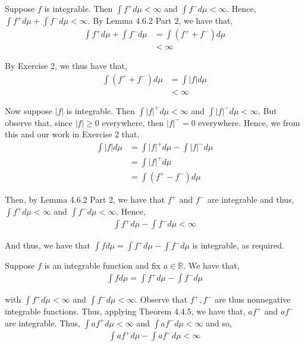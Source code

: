 \documentclass[12pt]{article}
\newenvironment{problem}[2][Problem]{\begin{trivlist}
\item[\hskip \labelsep {\bfseries #1}\hskip \labelsep {\bfseries #2.}]}{\end{trivlist}}
\begin{document}
\newpage
\begin{problem}{3}
\end{problem}

Suppose $f$ is integrable. Then $\int f^+ d\mu < \infty$ and $\int f^- d\mu < \infty$. Hence, $\int f^+ d\mu + \int f^- d\mu < \infty$. By Lemma 4.6.2 Part 2, we have that,
\begin{align*}
\int f^+ d\mu + \int f^- d\mu &= \int (f^+ + f^-) d\mu\\
&< \infty
\end{align*}

By Exercise 2, we thus have that,
\begin{align*}
\int (f^+ + f^-) d\mu &= \int |f| d\mu\\
&< \infty
\end{align*}

Now suppose $|f|$ is integrable. Then $\int |f|^+ d\mu < \infty$ and $\int |f|^- d\mu < \infty$. But observe that, since $|f| \geq 0$ everywhere, then $|f|^- = 0$ everywhere. Hence, we from this and our work in Exercise 2 that,
\begin{align*}
\int |f| d\mu &= \int |f|^+ d\mu - \int |f|^- d\mu\\
&= \int |f|^+ d\mu\\
&= \int (f^+ - f^-) d\mu
\end{align*}

Then, by Lemma 4.6.2 Part 2, we have that $f^+$ and $f^-$ are integrable and thus, $\int f^+ d\mu < \infty$ and $\int f^- d\mu < \infty$. Hence,
\begin{align*}
\int f^+ d\mu - \int f^- d\mu < \infty
\end{align*}

And thus, we have that $\int f d\mu = \int f^+ d\mu - \int f^- d\mu$ is integrable, as required.

\begin{problem}{4}
\end{problem}

Suppose $f$ is an integrable function and fix $a \in \mathbb{R}$. We have that,
\begin{align*}
\int f d\mu = \int f^+ d\mu - \int f^- d\mu
\end{align*}

with $\int f^+ d\mu < \infty$ and $\int f^- d\mu < \infty$. Observe that $f^+, f^-$ are thus nonnegative integrable functions. Thus, applying Theorem 4.4.5, we have that, $af^+$ and $af^-$ are integrable. Thus, $\int af^+ d\mu < \infty$ and $\int af^- d\mu < \infty$ and so,
\begin{align*}
\int af^+ d\mu - \int af^- d\mu < \infty 
\end{align*}
\end{document}
